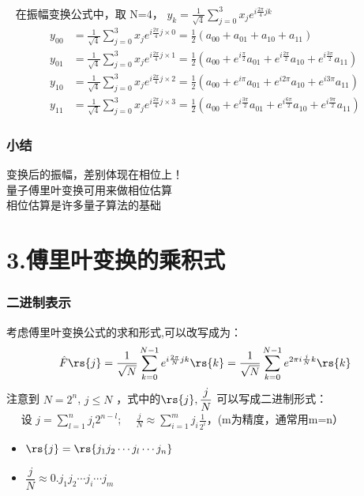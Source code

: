 \begin{frame}
    \frametitle{}
    \解~ 在振幅变换公式中，取 N=4， $y_k =  \frac{1}{\sqrt{4}}\sum_{j=0} ^{3} x_j  e^{i \frac{2\pi}{4} jk}$
    \[\begin{aligned}
        y_{00} &=\frac{1}{\sqrt{4}}\sum_{j=0} ^{3} x_j   e^{i \frac{2\pi}{4} j\times 0} = \frac{1}{2}(a_{00}+a_{01}+ a_{10}+ a_{11}) \\
        y_{01} &=\frac{1}{\sqrt{4}} \sum_{j=0} ^{3} x_j  e^{i \frac{2\pi}{4} j\times 1} = \frac{1}{2}(a_{00}+e^{i \frac{\pi}{2}}a_{01}+  e^{i \frac{2\pi}{2}}a_{10}+ e^{i \frac{3\pi}{2}}a_{11}) \\
        y_{10} &=\frac{1}{\sqrt{4}} \sum_{j=0} ^{3} x_j  e^{i \frac{2\pi}{4} j\times 2} = \frac{1}{2}(a_{00}+e^{i \pi}a_{01}+  e^{i 2\pi}a_{10}+  e^{i 3\pi}a_{11}) \\
        y_{11} &=\frac{1}{\sqrt{4}}\sum_{j=0} ^{3} x_j   e^{i \frac{2\pi}{4} j\times 3} = \frac{1}{2}(a_{00}+e^{i \frac{3\pi}{2}}a_{01}+  e^{i \frac{6\pi}{2}}a_{10}+  e^{i \frac{9\pi}{2}}a_{11}) 
    \end{aligned}\]
\end{frame}

\begin{frame}
    \frametitle{小结}
    {\Bullet} 变换后的振幅，差别体现在相位上！\\
    {\Bullet} 量子傅里叶变换可用来做相位估算\\
    {\Bullet} 相位估算是许多量子算法的基础 \\
\end{frame}

\section{3.傅里叶变换的乘积式}

\begin{frame}
    \frametitle{二进制表示}
    考虑傅里叶变换公式的求和形式,可以改写成为：
     \[ \hat{F} \rs{j} = \frac{1}{\sqrt{N}} \sum_{k=0} ^{N-1} e^{i \frac{2\pi}{N} jk} \rs{k} = \frac{1}{\sqrt{N}} \sum_{k=0} ^{N-1} e^{2\pi i  \frac{j}{N} k} \rs{k}\]
    {\Bullet} 注意到 $N=2^n $, $j \le N $ ，式中的$\rs{j}, \dfrac{j}{N}$ 可以写成二进制形式：\\
    $\hspace{1em}$ 设 $ j=\sum\limits_{l=1} ^n j_l 2^{n-l} $; $\quad \frac{j}{N} \approx \sum\limits_{i=1} ^m j_i \frac{1}{2^{i}} $，(m为精度，通常用m=n）
    \begin{itemize}
        \item $\rs{j}= \rs{j_1 j_2 \cdots j_l \cdots j_{n}}$ 
        \item $\dfrac{j}{N} \approx 0. j_{1} j_{2}\cdots j_{i} \cdots j_{m} $ 
    \end{itemize}
\end{frame}

